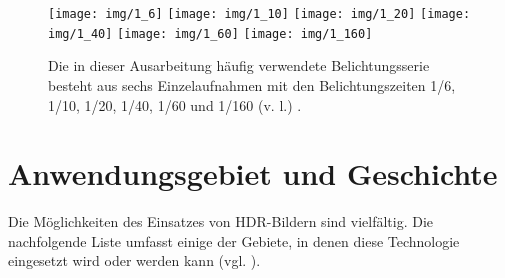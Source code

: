 \begin{figure}[H]
  \begin{center}
    \texttt{[image: img/1\_6]}
    \texttt{[image: img/1\_10]}
    \texttt{[image: img/1\_20]}
    \texttt{[image: img/1\_40]}
    \texttt{[image: img/1\_60]}
    \texttt{[image: img/1\_160]}
    \caption{Die in dieser Ausarbeitung häufig verwendete Belichtungsserie besteht aus sechs Einzelaufnahmen mit den Belichtungszeiten 1/6, 1/10, 1/20, 1/40, 1/60 und 1/160 (v. l.) \cite{tellone}.}
    \label{fig:teezer}
  \end{center}
\end{figure}





\section{Anwendungsgebiet und Geschichte}

Die Möglichkeiten des Einsatzes von \gls{HDR}-Bildern sind vielfältig. Die nachfolgende Liste umfasst einige der Gebiete, in denen diese Technologie eingesetzt wird oder werden kann (vgl. \cite[S.~87f]{Reinhard}).

